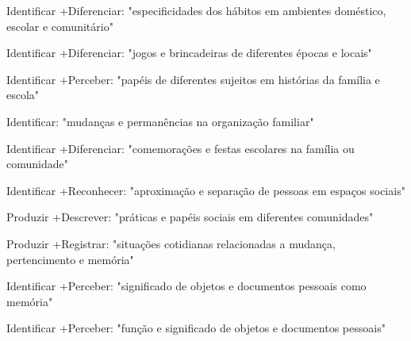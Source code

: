  Identificar +Diferenciar: "especificidades dos hábitos em ambientes doméstico, escolar e comunitário"

 Identificar +Diferenciar: "jogos e brincadeiras de diferentes épocas e locais"

 Identificar +Perceber: "papéis de diferentes sujeitos em histórias da família e escola"

 Identificar: "mudanças e permanências na organização familiar"

 Identificar +Diferenciar: "comemorações e festas escolares na família ou comunidade"

 Identificar +Reconhecer: "aproximação e separação de pessoas em espaços sociais"

 Produzir +Descrever: "práticas e papéis sociais em diferentes comunidades"

 Produzir +Registrar: "situações cotidianas relacionadas a mudança, pertencimento e memória"

 Identificar +Perceber: "significado de objetos e documentos pessoais como memória"

 Identificar +Perceber: "função e significado de objetos e documentos pessoais"


